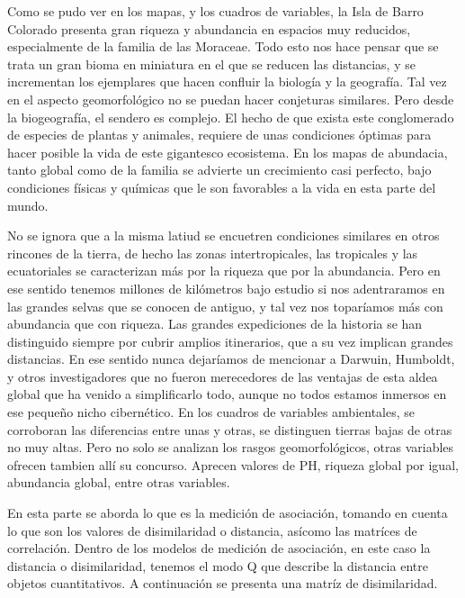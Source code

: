\documentclass[11pt,]{article}
\begin{document}
Como se pudo ver en los mapas, y los cuadros de variables, la Isla de
Barro Colorado presenta gran riqueza y abundancia en espacios muy
reducidos, especialmente de la familia de las Moraceae. Todo esto nos
hace pensar que se trata un gran bioma en miniatura en el que se reducen
las distancias, y se incrementan los ejemplares que hacen confluir la
biología y la geografía. Tal vez en el aspecto geomorfológico no se
puedan hacer conjeturas similares. Pero desde la biogeografía, el
sendero es complejo. El hecho de que exista este conglomerado de
especies de plantas y animales, requiere de unas condiciones óptimas
para hacer posible la vida de este gigantesco ecosistema. En los mapas
de abundacia, tanto global como de la familia se advierte un crecimiento
casi perfecto, bajo condiciones físicas y químicas que le son favorables
a la vida en esta parte del mundo.

No se ignora que a la misma latiud se encuetren condiciones similares en
otros rincones de la tierra, de hecho las zonas intertropicales, las
tropicales y las ecuatoriales se caracterizan más por la riqueza que por
la abundancia. Pero en ese sentido tenemos millones de kilómetros bajo
estudio si nos adentraramos en las grandes selvas que se conocen de
antiguo, y tal vez nos toparíamos más con abundancia que con riqueza.
Las grandes expediciones de la historia se han distinguido siempre por
cubrir amplios itinerarios, que a su vez implican grandes distancias. En
ese sentido nunca dejaríamos de mencionar a Darwuin, Humboldt, y otros
investigadores que no fueron merecedores de las ventajas de esta aldea
global que ha venido a simplificarlo todo, aunque no todos estamos
inmersos en ese pequeño nicho cibernético. En los cuadros de variables
ambientales, se corroboran las diferencias entre unas y otras, se
distinguen tierras bajas de otras no muy altas. Pero no solo se analizan
los rasgos geomorfológicos, otras variables ofrecen tambien allí su
concurso. Aprecen valores de PH, riqueza global por igual, abundancia
global, entre otras variables.

En esta parte se aborda lo que es la medición de asociación, tomando en
cuenta lo que son los valores de disimilaridad o distancia, asícomo las
matríces de correlación. Dentro de los modelos de medición de
asociación, en este caso la distancia o disimilaridad, tenemos el modo Q
que describe la distancia entre objetos cuantitativos. A continuación se
presenta una matríz de disimilaridad.
\end{document}
